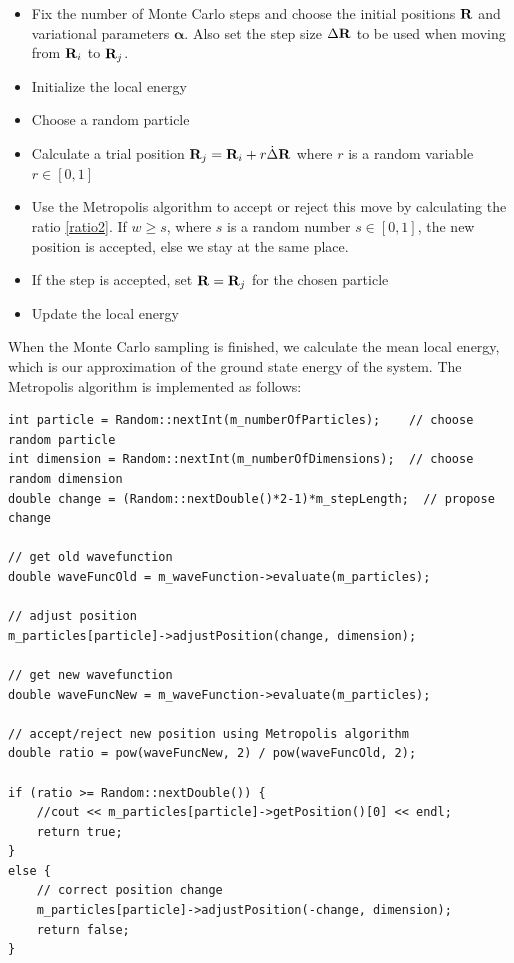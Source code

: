 \documentclass[english, a4paper]{article}
\begin{document}
\begin{itemize}
 \item Fix the number of Monte Carlo steps and choose the initial positions ${\bf R}$
       and variational parameters $\boldsymbol{\alpha}$.
       Also set the step size $\Delta {\bf R}$ to be used when moving from ${\bf R}_i$ to ${\bf R}_j$.
 \item Initialize the local energy
 \item Choose a random particle
 \item Calculate a trial position ${\bf R}_j = {\bf R}_i + r \dot \Delta {\bf R}$ where $r$ is a random variable
       $r \in [0,1]$
 \item Use the Metropolis algorithm to accept or reject this move by calculating the ratio \eqref{ratio2}. 
       If $w \geq s$, where $s$ is a random number $s \in [0,1]$, the new position is accepted, else we stay
       at the same place.
 \item If the step is accepted, set ${\bf R} = {\bf R}_j$ for the chosen particle
 \item Update the local energy
\end{itemize}
When the Monte Carlo sampling is finished, we calculate the mean local energy, which is our approximation
of the ground state energy of the system.
The Metropolis algorithm is implemented as follows:
\belowcaptionskip=-10pt
\begin{lstlisting}[label=MetropolisBrute,caption=Brute Forde Metropolis algorithm]
int particle = Random::nextInt(m_numberOfParticles);    // choose random particle
int dimension = Random::nextInt(m_numberOfDimensions);  // choose random dimension
double change = (Random::nextDouble()*2-1)*m_stepLength;  // propose change

// get old wavefunction
double waveFuncOld = m_waveFunction->evaluate(m_particles);

// adjust position
m_particles[particle]->adjustPosition(change, dimension);

// get new wavefunction
double waveFuncNew = m_waveFunction->evaluate(m_particles);

// accept/reject new position using Metropolis algorithm
double ratio = pow(waveFuncNew, 2) / pow(waveFuncOld, 2);

if (ratio >= Random::nextDouble()) {
    //cout << m_particles[particle]->getPosition()[0] << endl;
    return true;
}
else {
    // correct position change
    m_particles[particle]->adjustPosition(-change, dimension);
    return false;
}
\end{lstlisting}
\end{document}
